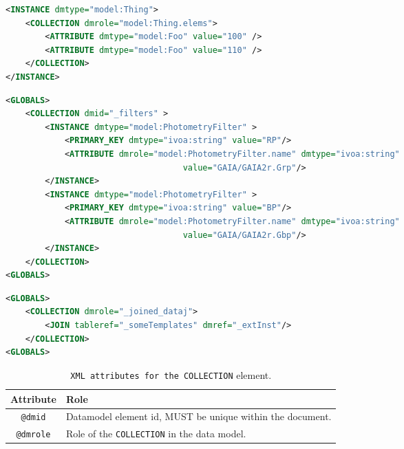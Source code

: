 \begin{lstlisting}[caption={Example of \texttt{COLLECTION} child of INSTANCE},language=XML]
<INSTANCE dmtype="model:Thing">
    <COLLECTION dmrole="model:Thing.elems">
        <ATTRIBUTE dmtype="model:Foo" value="100" />
        <ATTRIBUTE dmtype="model:Foo" value="110" />
    </COLLECTION>
</INSTANCE>
\end{lstlisting}   

\begin{lstlisting}[caption={Example of \texttt{COLLECTION} child of GLOBALS},language=XML]
<GLOBALS>
    <COLLECTION dmid="_filters" >
        <INSTANCE dmtype="model:PhotometryFilter" >
            <PRIMARY_KEY dmtype="ivoa:string" value="RP"/>
            <ATTRIBUTE dmrole="model:PhotometryFilter.name" dmtype="ivoa:string"
                                    value="GAIA/GAIA2r.Grp"/>
        </INSTANCE>
        <INSTANCE dmtype="model:PhotometryFilter" >
            <PRIMARY_KEY dmtype="ivoa:string" value="BP"/>
            <ATTRIBUTE dmrole="model:PhotometryFilter.name" dmtype="ivoa:string"
                                    value="GAIA/GAIA2r.Gbp"/>
        </INSTANCE>
    </COLLECTION>
<GLOBALS>
\end{lstlisting}   

\begin{lstlisting}[caption={Example of \texttt{COLLECTION} populated with a JOIN},language=XML]
<GLOBALS>
    <COLLECTION dmrole="_joined_dataj">
        <JOIN tableref="_someTemplates" dmref="_extInst"/>
    </COLLECTION>
<GLOBALS>
\end{lstlisting}   

\begin{table}[!htbp]
  \small
  \centering
  \begin{tabulary}{\linewidth}{|c|J|}       
    \hline 
         \textbf{Attribute} & 
         \textbf {Role}\\
    \hline
    \hline  
         \texttt{@dmid} & 
         Datamodel element id, MUST be unique within the document.\\
    \hline 
         \texttt{@dmrole} & 
         Role of the \texttt{COLLECTION} in the data model. \\
    \hline 
  \end{tabulary}
  \caption{\texttt{XML attributes for the COLLECTION} element.} 
  \label{tbl:collection-att}
 \end{table}

